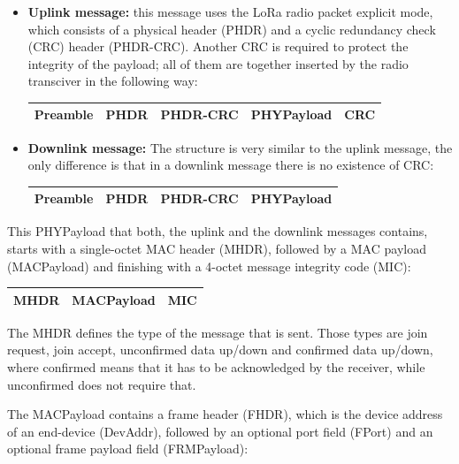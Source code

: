 \begin{itemize}
    \item \textbf{Uplink message:} this message uses the 
    LoRa radio packet explicit mode, which consists of a physical 
    header (PHDR) and a cyclic redundancy check (CRC) header (PHDR-CRC). 
    Another CRC is required to protect the integrity of the payload; all of
    them are together inserted by the radio transciver in the following way:
    \begin{center}
    \begin{tabular}{ |c|c|c|c|c| } 
     \hline
     Preamble & PHDR & PHDR-CRC & PHYPayload & CRC\\ 
     \hline
    \end{tabular}
    \end{center}
    
    \item \textbf{Downlink message:} The structure is very similar to the uplink message, the only difference is that in a downlink message there is no existence of CRC:
    \begin{center}
    \begin{tabular}{ |c|c|c|c| } 
     \hline
     Preamble & PHDR & PHDR-CRC & PHYPayload \\ 
     \hline
    \end{tabular}
    \end{center}
\end{itemize}
    
This PHYPayload that both, the uplink and the downlink messages contains, starts with a single-octet MAC header (MHDR), followed by a MAC payload (MACPayload) and finishing with a 4-octet message
integrity code (MIC):
\begin{center}
\begin{tabular}{ |c|c|c| } 
    \hline
    MHDR & MACPayload & MIC \\ 
    \hline
\end{tabular}
\end{center}

The MHDR defines the type of the message that is sent. Those types are join request, join accept, unconfirmed data up/down and confirmed data up/down, where confirmed means that it has to be acknowledged by the receiver, while unconfirmed does not require that.

The MACPayload contains a frame header (FHDR), which is the device address of an end-device (DevAddr), followed by an optional port field (FPort) and an optional frame payload field (FRMPayload):

